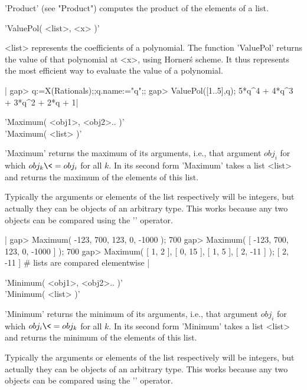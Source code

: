 'Product' (see "Product") computes the product of the elements of a list.

%

'ValuePol( <list>, <x> )'

<list> represents the coefficients of a polynomial. The function 'ValuePol'
returns  the value of that  polynomial at <x>, using  Horner\' s scheme. It
thus  represents  the  most  efficient  way  to  evaluate  the  value  of a
polynomial.

|    gap> q:=X(Rationals);;q.name:="q";;
    gap> ValuePol([1..5],q);
    5*q^4 + 4*q^3 + 3*q^2 + 2*q + 1|

%
%

'Maximum( <obj1>, <obj2>.. )' \\
'Maximum( <list> )'

'Maximum' returns  the  maximum of  its  arguments,  i.e.,  that argument
$obj_i$ for  which  $obj_k \<= obj_i$ for all  $k$.   In its second  form
'Maximum' takes  a list <list> and returns the maximum of the elements of
this list.

Typically the arguments  or elements  of the  list  respectively will  be
integers, but actually they  can be  objects of an arbitrary  type.  This
works because any two objects can be compared using the '\<' operator.

|    gap> Maximum( -123, 700, 123, 0, -1000 );
    700
    gap> Maximum( [ -123, 700, 123, 0, -1000 ] );
    700
    gap> Maximum( [ 1, 2 ], [ 0, 15 ], [ 1, 5 ], [ 2, -11 ] );
    [ 2, -11 ]        # lists are compared elementwise |

%
%

'Minimum( <obj1>, <obj2>.. )' \\
'Minimum( <list> )'

'Minimum'  returns  the  minimum of  its  arguments, i.e.,  that argument
$obj_i$  for which  $obj_i \<=  obj_k$  for all $k$.  In its second  form
'Minimum' takes a list <list> and returns the  minimum of the elements of
this list.

Typically  the  arguments  or elements  of  the list respectively will be
integers, but actually  they can be  objects  of an arbitrary type.  This
works because any two objects can be compared using the '\<' operator.


